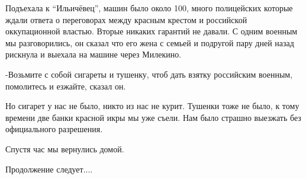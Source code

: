 Подъехала к \enquote{Ильичёвец}, машин было около 100, много полицейских которые ждали
ответа о переговорах между красным крестом и российской оккупационной властью.
Вторые никаких гарантий не давали. С одним военным мы разговорились, он сказал
что его жена с семьей и подругой пару дней назад рискнула и выехала на машине
через Милекино. 

-Возьмите с собой сигареты и тушенку, чтоб дать взятку российским военным,
помолитесь и езжайте, сказал он. 

Но сигарет у нас не было, никто из нас не курит. Тушенки тоже не было, к тому
времени две банки красной икры мы уже съели. Нам было страшно выезжать без
официального разрешения. 

Спустя час мы вернулись домой. 

Продолжение следует....

